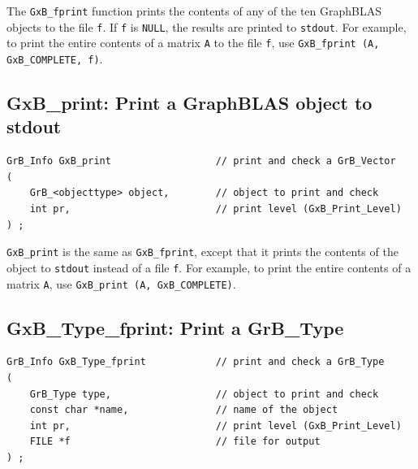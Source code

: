 The \verb'GxB_fprint' function prints the contents of any of the ten GraphBLAS
objects to the file \verb'f'.  If \verb'f' is \verb'NULL', the results are
printed to \verb'stdout'.  For example, to print the entire contents of a
matrix \verb'A' to the file \verb'f', use
\verb'GxB_fprint (A, GxB_COMPLETE, f)'.

\subsection{{\sf GxB\_print:} Print a GraphBLAS object to {\sf stdout}} %
\label{gxb_print}

\begin{mdframed}[userdefinedwidth=6in]
{\footnotesize
\begin{verbatim}
GrB_Info GxB_print                  // print and check a GrB_Vector
(
    GrB_<objecttype> object,        // object to print and check
    int pr,                         // print level (GxB_Print_Level)
) ;
\end{verbatim} } \end{mdframed}

\verb'GxB_print' is the same as \verb'GxB_fprint', except that it prints the
contents of the object to \verb'stdout' instead of a file \verb'f'.  For
example, to print the entire contents of a matrix \verb'A',  use
\verb'GxB_print (A, GxB_COMPLETE)'.

\subsection{{\sf GxB\_Type\_fprint:} Print a {\sf GrB\_Type}}

\begin{mdframed}[userdefinedwidth=6in]
{\footnotesize
\begin{verbatim}
GrB_Info GxB_Type_fprint            // print and check a GrB_Type
(
    GrB_Type type,                  // object to print and check
    const char *name,               // name of the object
    int pr,                         // print level (GxB_Print_Level)
    FILE *f                         // file for output
) ;
\end{verbatim} } \end{mdframed}


